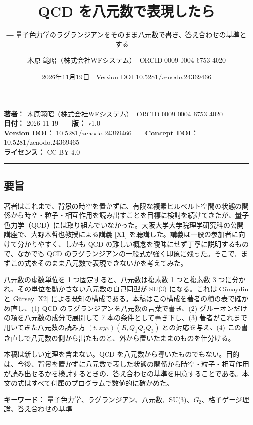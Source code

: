 \documentclass[
  a4paper,
]{ltjsarticle}
\title{QCD を八元数で表現したら}
\subtitle{―
量子色力学のラグランジアンをそのまま八元数で書き、答え合わせの基準とする
―}
\author{木原 範昭（株式会社WFシステム）　ORCID 0009-0004-6753-4020}
\date{2026年11月19日　Version DOI 10.5281/zenodo.24369466}
\begin{document}
\maketitle

\textbf{著者：} 木原範昭（株式会社WFシステム）　ORCID
0009-0004-6753-4020\\
\textbf{日付：} 2026-11-19　　\textbf{版：} v1.0\\
\textbf{Version DOI：} 10.5281/zenodo.24369466　　\textbf{Concept DOI：}
10.5281/zenodo.24369465\\
\textbf{ライセンス：} CC BY 4.0

\begin{center}\rule{0.5\linewidth}{0.5pt}\end{center}

\subsection{要旨}\label{ux8981ux65e8}

著者はこれまで、背景の時空を置かずに、有限な複素ヒルベルト空間の状態の関係から時空・粒子・相互作用を読み出すことを目標に検討を続けてきたが、量子色力学（QCD）には取り組んでいなかった。大阪大学大学院理学研究科の公開講座で、大野木哲也教授による講義
{[}X1{]} を聴講した。講義は一般の参加者に向けて分かりやすく、しかも QCD
の難しい概念を曖昧にせず丁寧に説明するもので、なかでも QCD
のラグランジアンの一般式が強く印象に残った。そこで、まずこの式をそのまま八元数で表現できないかを考えてみた。

八元数の虚数単位を 1 つ固定すると、八元数は複素数 1 つと複素数 3
つに分かれ、その単位を動かさない八元数の自己同型が SU(3) になる。これは
Günaydin と Gürsey {[}X2{]}
による既知の構成である。本稿はこの構成を著者の積の表で確かめ直し、(1)
QCD のラグランジアンを八元数の言葉で書き、(2)
グルーオンだけの項を八元数の成分で展開して 7 本の条件として書き下し、(3)
著者がこれまで用いてきた八元数の読み方 \((t, xyz)(R, Q_1Q_2Q_3)\)
との対応を与え、(4)
この書き直しで八元数の側から出たものと、外から置いたままのものを仕分ける。

本稿は新しい定理を含まない。QCD
を八元数から導いたものでもない。目的は、今後、背景を置かずに八元数で表した状態の関係から時空・粒子・相互作用が読み出せるかを検討するときの、答え合わせの基準を用意することである。本文の式はすべて付属のプログラムで数値的に確かめた。

\textbf{キーワード：}
量子色力学、ラグランジアン、八元数、SU(3)、\(G_2\)、格子ゲージ理論、答え合わせの基準

\begin{center}\rule{0.5\linewidth}{0.5pt}\end{center}
\end{document}
